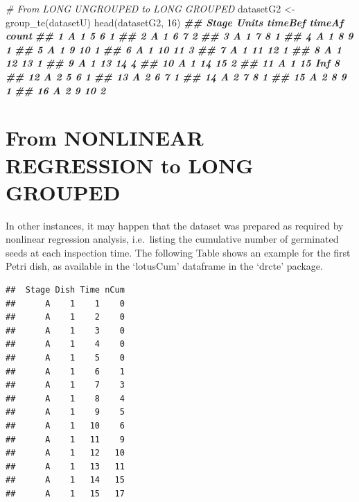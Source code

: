 \documentclass[
]{book}
\newenvironment{Shaded}{\begin{snugshade}}{\end{snugshade}}
\newcommand{\CommentTok}[1]{\textcolor[rgb]{0.56,0.35,0.01}{\textit{#1}}}
\newcommand{\DecValTok}[1]{\textcolor[rgb]{0.00,0.00,0.81}{#1}}
\newcommand{\DocumentationTok}[1]{\textcolor[rgb]{0.56,0.35,0.01}{\textbf{\textit{#1}}}}
\newcommand{\FunctionTok}[1]{\textcolor[rgb]{0.00,0.00,0.00}{#1}}
\newcommand{\NormalTok}[1]{#1}
\newcommand{\OtherTok}[1]{\textcolor[rgb]{0.56,0.35,0.01}{#1}}
\begin{document}
\begin{Shaded}
\begin{Highlighting}[]
\CommentTok{\# From LONG UNGROUPED to LONG GROUPED}
\NormalTok{datasetG2 }\OtherTok{\textless{}{-}} \FunctionTok{group\_te}\NormalTok{(datasetU)}
\FunctionTok{head}\NormalTok{(datasetG2, }\DecValTok{16}\NormalTok{)}
\DocumentationTok{\#\#    Stage Units timeBef timeAf count}
\DocumentationTok{\#\# 1      A     1       5      6     1}
\DocumentationTok{\#\# 2      A     1       6      7     2}
\DocumentationTok{\#\# 3      A     1       7      8     1}
\DocumentationTok{\#\# 4      A     1       8      9     1}
\DocumentationTok{\#\# 5      A     1       9     10     1}
\DocumentationTok{\#\# 6      A     1      10     11     3}
\DocumentationTok{\#\# 7      A     1      11     12     1}
\DocumentationTok{\#\# 8      A     1      12     13     1}
\DocumentationTok{\#\# 9      A     1      13     14     4}
\DocumentationTok{\#\# 10     A     1      14     15     2}
\DocumentationTok{\#\# 11     A     1      15    Inf     8}
\DocumentationTok{\#\# 12     A     2       5      6     1}
\DocumentationTok{\#\# 13     A     2       6      7     1}
\DocumentationTok{\#\# 14     A     2       7      8     1}
\DocumentationTok{\#\# 15     A     2       8      9     1}
\DocumentationTok{\#\# 16     A     2       9     10     2}
\end{Highlighting}
\end{Shaded}

\hypertarget{from-nonlinear-regression-to-long-grouped}{%
\section{From NONLINEAR REGRESSION to LONG GROUPED}\label{from-nonlinear-regression-to-long-grouped}}

In other instances, it may happen that the dataset was prepared as required by nonlinear regression analysis, i.e.~listing the cumulative number of germinated seeds at each inspection time. The following Table shows an example for the first Petri dish, as available in the `lotusCum' dataframe in the `drcte' package.

\begin{verbatim}
##  Stage Dish Time nCum
##      A    1    1    0
##      A    1    2    0
##      A    1    3    0
##      A    1    4    0
##      A    1    5    0
##      A    1    6    1
##      A    1    7    3
##      A    1    8    4
##      A    1    9    5
##      A    1   10    6
##      A    1   11    9
##      A    1   12   10
##      A    1   13   11
##      A    1   14   15
##      A    1   15   17
\end{verbatim}
\end{document}
